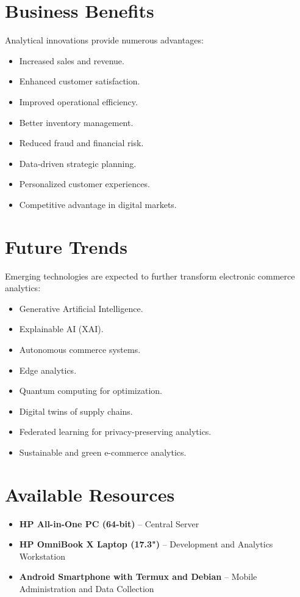 \documentclass[12pt]{article}
\begin{document}
\section{Business Benefits}

Analytical innovations provide numerous advantages:

\begin{itemize}
    \item Increased sales and revenue.
    \item Enhanced customer satisfaction.
    \item Improved operational efficiency.
    \item Better inventory management.
    \item Reduced fraud and financial risk.
    \item Data-driven strategic planning.
    \item Personalized customer experiences.
    \item Competitive advantage in digital markets.
\end{itemize}

\section{Future Trends}

Emerging technologies are expected to further transform electronic commerce analytics:

\begin{itemize}
    \item Generative Artificial Intelligence.
    \item Explainable AI (XAI).
    \item Autonomous commerce systems.
    \item Edge analytics.
    \item Quantum computing for optimization.
    \item Digital twins of supply chains.
    \item Federated learning for privacy-preserving analytics.
    \item Sustainable and green e-commerce analytics.
\end{itemize}


\section{Available Resources}

\begin{itemize}
    \item \textbf{HP All-in-One PC (64-bit)} -- Central Server
    \item \textbf{HP OmniBook X Laptop (17.3")} -- Development and Analytics Workstation
    \item \textbf{Android Smartphone with Termux and Debian} -- Mobile Administration and Data Collection
\end{itemize}
\end{document}
